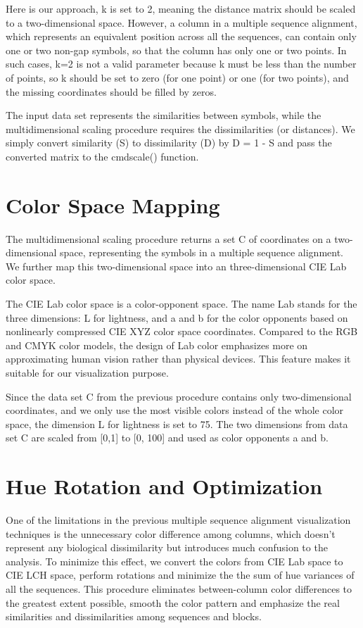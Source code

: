 Here is our approach, k is set to 2, meaning the distance matrix should be scaled to a two-dimensional space. However, a column in a multiple sequence alignment, which represents an equivalent position across all the sequences, can contain only one or two non-gap symbols, so that the column has only one or two points. In such cases, k=2 is not a valid parameter because k must be less than the number of points, so k should be set to zero (for one point) or one (for two points), and the missing coordinates should be filled by zeros.

The input data set represents the similarities between symbols, while the multidimensional scaling procedure requires the dissimilarities (or distances). We simply convert similarity (S) to dissimilarity (D) by D = 1 - S and pass the converted matrix to the cmdscale() function.

\section{Color Space Mapping}

The multidimensional scaling procedure returns a set C of coordinates on a two-dimensional space, representing the symbols in a multiple sequence alignment. We further map this two-dimensional space into an three-dimensional CIE Lab color space.

The CIE Lab color space is a color-opponent space. The name Lab stands for the three dimensions: L for lightness, and a and b for the color opponents based on nonlinearly compressed CIE XYZ color space coordinates. Compared to the RGB and CMYK color models, the design of Lab color emphasizes more on approximating human vision rather than physical devices. This feature makes it suitable for our visualization purpose.

Since the data set C from the previous procedure contains only two-dimensional coordinates, and we only use the most visible colors instead of the whole color space, the dimension L for lightness is set to 75. The two dimensions from data set C are scaled from [0,1] to [0, 100] and used as color opponents a and b.

\section{Hue Rotation and Optimization}

One of the limitations in the previous multiple sequence alignment visualization techniques is the unnecessary color difference among columns, which doesn’t represent any biological dissimilarity but introduces much confusion to the analysis. To minimize this effect, we convert the colors from CIE Lab space to CIE LCH space, perform rotations and minimize the the sum of hue variances of all the sequences. This procedure eliminates between-column color differences to the greatest extent possible, smooth the color pattern and emphasize the real similarities and dissimilarities among sequences and blocks.

